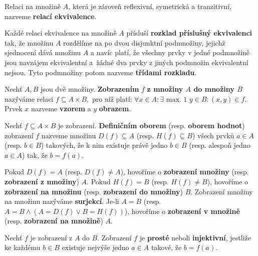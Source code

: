 \begin{definition}
  Relaci na množině $A$, která je zároveň reflexivní, symetrická a tranzitivní, nazveme \textbf{relací ekvivalence}.
\end{definition}

\begin{pozn}
  Každé relaci ekvivalence na množině $A$ přísluší \textbf{rozklad příslušný ekvivalenci} tak, že množinu $A$ rozdělíme na po dvou disjunktní podmnožiny,
  jejichž sjednocení dává množinu $A$ a navíc platí, že všechny prvky v jedné podmnožině jsou navzájem ekvivalentní a~žádné dva prvky z jiných podmnožin ekvivalentní nejsou. Tyto podmnožiny potom nazveme \textbf{třídami rozkladu}.
\end{pozn}

\begin{definition}
  Nechť $A,B$ jsou dvě množiny. \textbf{Zobrazením} $f$ \textbf{z množiny $A$ do množiny $B$} nazýváme relaci $f\subseteq A \times B,$ pro níž platí: $\forall x \in A: \exists \text{ max. 1 } y \in B: (x,y) \in f$. Prvek $x$ nazveme \textbf{vzorem} a $y$ \textbf{obrazem}.
\end{definition}

\begin{definition}
  Nechť $f\subseteq A\times B$ je zobrazení. \textbf{Definičním oborem} (resp. \textbf{oborem hodnot}) zobrazení $f$ nazveme množinu $D(f)\subseteq A$
  (resp. $H(f)\subseteq B$) všech prvků $a\in A$ (resp. $b\in B$) takových, že k nim existuje právě jedno $b\in B$ (resp. alespoň jedno $a\in A$) tak, že $b=f(a)$.
\end{definition}

\begin{definition}
  Pokud $D(f) = A$ (resp. $D(f)\ne A$), hovoříme o \textbf{zobrazení množiny} (resp. \textbf{zobrazení z množiny}) $A$. Pokud $H(f)=B$ (resp. $H(f)\ne B$), hovoříme o \textbf{zobrazení na množinu} (resp. \textbf{zobrazení do množiny}) $B$.
  Zobrazení množiny na množinu nazýváme \textbf{surjekcí}. Je-li $A=B$ (resp. $A=B \land ( A = D(f) \lor B = H(f))$), hovoříme o \textbf{zobrazení v množině} (resp. \textbf{zobrazení na množině}) $A$.
\end{definition}

\begin{definition}
  Nechť $f$ je zobrazení z $A$ do $B$. Zobrazení $f$ je \textbf{prosté} neboli \textbf{injektivní}, jestliže ke každému $b\in B$ existuje nejvýše jedno $a \in A$ takové, že $b=f(a).$
\end{definition}

